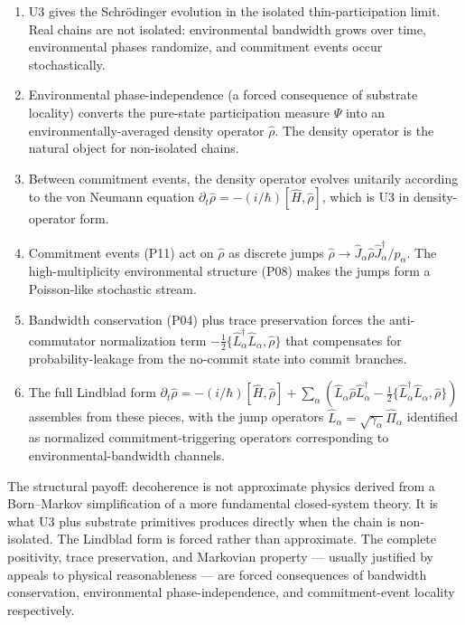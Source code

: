\documentclass[11pt,a4paper]{article}
\begin{document}
\begin{enumerate}[noitemsep]
  \item U3 gives the Schr\"odinger evolution in the isolated thin-participation limit. Real chains are not isolated: environmental bandwidth grows over time, environmental phases randomize, and commitment events occur stochastically.
  \item Environmental phase-independence (a forced consequence of substrate locality) converts the pure-state participation measure $\Psi$ into an environmentally-averaged density operator $\hat\rho$. The density operator is the natural object for non-isolated chains.
  \item Between commitment events, the density operator evolves unitarily according to the von Neumann equation $\partial_t \hat\rho = -(i/\hbar)[\hat H, \hat\rho]$, which is U3 in density-operator form.
  \item Commitment events (P11) act on $\hat\rho$ as discrete jumps $\hat\rho \to \hat J_\alpha \hat\rho \hat J_\alpha^\dagger / p_\alpha$. The high-multiplicity environmental structure (P08) makes the jumps form a Poisson-like stochastic stream.
  \item Bandwidth conservation (P04) plus trace preservation forces the anti-commutator normalization term $-\tfrac{1}{2}\{\hat L_\alpha^\dagger \hat L_\alpha, \hat\rho\}$ that compensates for probability-leakage from the no-commit state into commit branches.
  \item The full Lindblad form $\partial_t \hat\rho = -(i/\hbar)[\hat H, \hat\rho] + \sum_\alpha(\hat L_\alpha \hat\rho \hat L_\alpha^\dagger - \tfrac{1}{2}\{\hat L_\alpha^\dagger \hat L_\alpha, \hat\rho\})$ assembles from these pieces, with the jump operators $\hat L_\alpha = \sqrt{\gamma_\alpha}\hat\Pi_\alpha$ identified as normalized commitment-triggering operators corresponding to environmental-bandwidth channels.
\end{enumerate}

The structural payoff: decoherence is not approximate physics derived from a Born--Markov simplification of a more fundamental closed-system theory. It is what U3 plus substrate primitives produces directly when the chain is non-isolated. The Lindblad form is forced rather than approximate. The complete positivity, trace preservation, and Markovian property --- usually justified by appeals to physical reasonableness --- are forced consequences of bandwidth conservation, environmental phase-independence, and commitment-event locality respectively.
\end{document}
